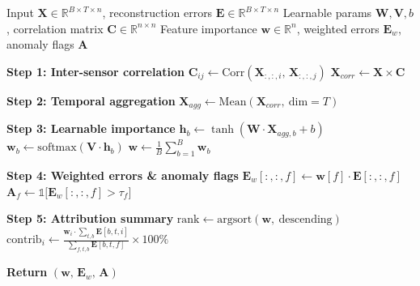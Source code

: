 \begin{algorithm}[H]
\footnotesize
\caption{Feature-Level Anomaly Attribution}
\label{alg:feature_attribution}
\begin{algorithmic}
\Require Input $\mathbf{X} \in \mathbb{R}^{B \times T \times n}$, reconstruction errors $\mathbf{E} \in \mathbb{R}^{B \times T \times n}$
\Require Learnable params $\mathbf{W}, \mathbf{V}, b$, correlation matrix $\mathbf{C} \in \mathbb{R}^{n \times n}$
\Ensure Feature importance $\mathbf{w} \in \mathbb{R}^{n}$, weighted errors $\mathbf{E}_{w}$, anomaly flags $\mathbf{A}$

\State \textbf{Step 1: Inter-sensor correlation}
\State $\mathbf{C}_{ij} \gets \text{Corr}(\mathbf{X}_{:,:,i},\, \mathbf{X}_{:,:,j})$ 
\State $\mathbf{X}_{corr} \gets \mathbf{X} \times \mathbf{C}$

\State \textbf{Step 2: Temporal aggregation}
\State $\mathbf{X}_{agg} \gets \text{Mean}(\mathbf{X}_{corr},\ \text{dim}=T)$ 

\State \textbf{Step 3: Learnable importance}
    \State $\mathbf{h}_b \gets \tanh(\mathbf{W} \cdot \mathbf{X}_{agg,b} + b)$
    \State $\mathbf{w}_b \gets \text{softmax}(\mathbf{V} \cdot \mathbf{h}_b)$ 
\EndFor
\State $\mathbf{w} \gets \frac{1}{B}\sum_{b=1}^{B} \mathbf{w}_b$ 

\State \textbf{Step 4: Weighted errors \& anomaly flags}
    \State $\mathbf{E}_{w}[:,:,f] \gets \mathbf{w}[f] \cdot \mathbf{E}[:,:,f]$
    \State $\mathbf{A}_f \gets \mathbb{1}\big[\mathbf{E}_{w}[:,:,f] > \tau_f\big]$
\EndFor

\State \textbf{Step 5: Attribution summary}
\State $\text{rank} \gets \text{argsort}(\mathbf{w},\ \text{descending})$
\State $\text{contrib}_i \gets \frac{\mathbf{w}_i \cdot \sum_{t,b} \mathbf{E}[b,t,i]}{\sum_{f,t,b} \mathbf{E}[b,t,f]} \times 100\%$

\State \textbf{Return} $(\mathbf{w},\, \mathbf{E}_{w},\, \mathbf{A})$
\end{algorithmic}
\end{algorithm}
